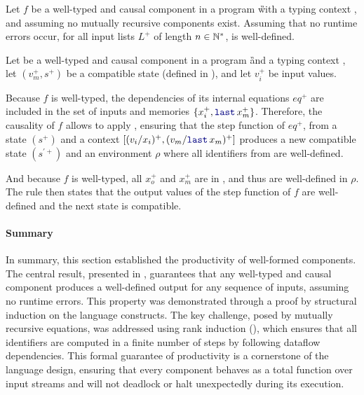\begin{theorem}[Productivity]
    \label{thm:semantics:grsync:theorems:productivity}
    Let $f$ be a well-typed and causal component in a program \G with a typing context \tyCtx, and
    assuming no mutually recursive components exist. Assuming that no runtime errors occur, for all
    input lists $L^+$ of length $n \in \mathbb{N}^*$,  is well-defined.
\end{theorem}
\begin{skippableproof}
    Let  be a well-typed and causal component in a
    program \G and a typing context \tyCtx, let $(v_m^+, s^+)$ be a compatible state (defined
    in ), and let $v_i^+$ be input values.

    Because $f$ is well-typed, the dependencies of its internal equations $eq^+$ are included in
    the set of inputs and memories $\{x_i^+, \last{x_m}^+\}$. Therefore, the causality of $f$ allows
    to apply , ensuring that the step function of
    $eq^+$, from a state $(s^+)$ and a context $[(v_i/x_i)^+, (v_m/\last{x_m})^+]$ produces a new
    compatible state $(s^{\prime+})$ and an environment $\rho$ where all identifiers from
     are well-defined.

    And because $f$ is well-typed, all $x_o^+$ and $x_m^+$ are in , and thus are
    well-defined in $\rho$. The rule  then states
    that the output values of the step function of $f$ are well-defined and the next state is
    compatible.

    \setcounter{paragraph}{0}
\end{skippableproof}

\paragraph{Summary}
In summary, this section established the productivity of well-formed \GRSync components. The central
result, presented in , guarantees that any
well-typed and causal component produces a well-defined output for any sequence of inputs, assuming
no runtime errors.
%
This property was demonstrated through a proof by structural induction on the language constructs.
%
The key challenge, posed by mutually recursive equations, was addressed using rank induction
(), which ensures that all identifiers are
computed in a finite number of steps by following dataflow dependencies.
%
This formal guarantee of productivity is a cornerstone of the language design, ensuring that every
component behaves as a total function over input streams and will not deadlock or halt unexpectedly
during its execution.
